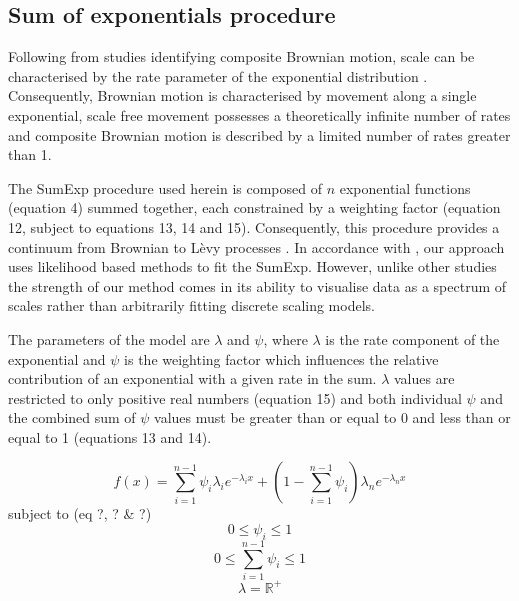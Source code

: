 \documentclass[11pt,usenames,dvipsnames,a4paper]{article}
\begin{document}
\subsection{Sum of exponentials procedure}

\begin{linenumbers}
\hspace{\parindent}
Following from studies identifying composite Brownian motion, scale can be characterised by the rate parameter of the exponential distribution \citep{Petrovskii2011, Jansen2012}. Consequently, Brownian motion is characterised by movement along a single exponential, scale free movement possesses a theoretically infinite number of rates and composite Brownian motion is described by a limited number of rates greater than 1. 

The SumExp procedure used herein is composed of $n$ exponential functions (equation 4) summed together, each constrained by a weighting factor (equation 12, subject to equations 13, 14 and 15). Consequently, this procedure provides a continuum from Brownian to L\`evy processes \citep{Jansen2012}. In accordance with \cite{Murphy2007}, our approach uses likelihood based methods to fit the SumExp. However, unlike other studies \citep{Petrovskii2011, Gautestad2012, Jansen2012, Zhao2016, Sakamoto2017} the strength of our method comes in its ability to visualise data as a spectrum of scales rather than arbitrarily fitting discrete scaling models.

The parameters of the model are $\lambda$ and $\psi$, where $\lambda$ is the rate component of the exponential and $\psi$ is the weighting factor which influences the relative contribution of an exponential with a given rate in the sum. $\lambda$ values are restricted to only positive real numbers (equation 15) and both individual $\psi$ and the combined sum of $\psi$ values must be greater than or equal to 0 and less than or equal to 1 (equations 13 and 14).
\end{linenumbers}

\begin{equation}
f(x) = \sum_{i=1}^{n-1} \psi_i \lambda_i e^{-\lambda_i x} + \left(1 - \sum_{i=1}^{n-1}\psi_i\right) \lambda_n e^{-\lambda_n x}
\end{equation}
subject to (eq ?, ? \& ?)
\begin{equation}
0\leq \psi_i \leq 1
\end{equation}
\begin{equation}
0\leq \sum_{i=1}^{n-1}\psi_i \leq 1
\end{equation}
\begin{equation}
\lambda = \mathbb{R}^+
\end{equation}
\end{document}
